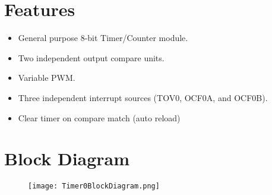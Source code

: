 

% 

\section{Features}
\begin{itemize}
    \item General purpose 8-bit Timer/Counter module.
    \item Two independent output compare units.
    \item Variable PWM.
    \item Three independent interrupt sources (TOV0, OCF0A, and OCF0B).
    \item Clear timer on compare match (auto reload)
\end{itemize}

\section{Block Diagram}
\begin{figure}[H]
    \begin{center}
        \texttt{[image: Timer0BlockDiagram.png]}
    \end{center}
\end{figure}

